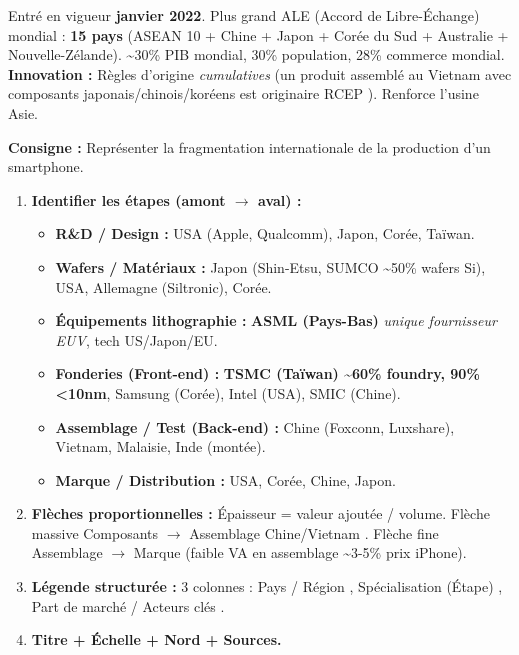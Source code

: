 \documentclass[11pt]{article}
\begin{document}
\begin{propriete}
Entré en vigueur \textbf{janvier 2022}. Plus grand ALE (Accord de Libre-Échange) mondial : \textbf{15 pays} (ASEAN 10 + Chine + Japon + Corée du Sud + Australie + Nouvelle-Zélande). \textasciitilde 30\% PIB mondial, 30\% population, 28\% commerce mondial. \textbf{Innovation :} Règles d'origine \emph{cumulatives} (un produit assemblé au Vietnam avec composants japonais/chinois/koréens est \og originaire RCEP \fg). Renforce l'usine Asie.
\end{propriete}

\begin{methode}
\textbf{Consigne :} Représenter la fragmentation internationale de la production d'un smartphone.
\begin{enumerate}
    \item \textbf{Identifier les étapes (amont $\rightarrow$ aval) :}
        \begin{itemize}
            \item \textbf{R\&D / Design :} USA (Apple, Qualcomm), Japon, Corée, Taïwan.
            \item \textbf{Wafers / Matériaux :} Japon (Shin-Etsu, SUMCO \textasciitilde 50\% wafers Si), USA, Allemagne (Siltronic), Corée.
            \item \textbf{Équipements lithographie :} \textbf{ASML (Pays-Bas)} \emph{unique fournisseur EUV}, tech US/Japon/EU.
            \item \textbf{Fonderies (Front-end) :} \textbf{TSMC (Taïwan) \textasciitilde 60\% foundry, 90\% <10nm}, Samsung (Corée), Intel (USA), SMIC (Chine).
            \item \textbf{Assemblage / Test (Back-end) :} Chine (Foxconn, Luxshare), Vietnam, Malaisie, Inde (montée).
            \item \textbf{Marque / Distribution :} USA, Corée, Chine, Japon.
        \end{itemize}
    \item \textbf{Flèches proportionnelles :} Épaisseur = valeur ajoutée / volume. Flèche massive \og Composants $\rightarrow$ Assemblage Chine/Vietnam \fg. Flèche fine \og Assemblage $\rightarrow$ Marque \fg (faible VA en assemblage \textasciitilde 3-5\% prix iPhone).
    \item \textbf{Légende structurée :} 3 colonnes : \og Pays / Région \fg, \og Spécialisation (Étape) \fg, \og Part de marché / Acteurs clés \fg.
    \item \textbf{Titre + Échelle + Nord + Sources.}
\end{enumerate}
\end{methode}
\end{document}
